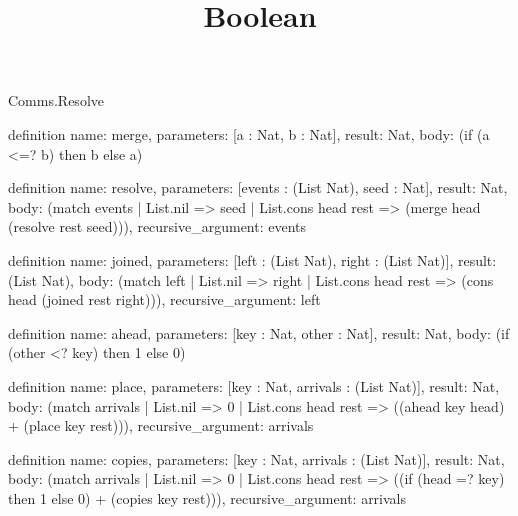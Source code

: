 \begin{lexlean}{Comms.Resolve}
\title{Boolean}
\begin{semanticmodule}
definition{
  name: merge,
  parameters: [a : Nat, b : Nat],
  result: Nat,
  body: (if (a <=? b) then b else a)
}

definition{
  name: resolve,
  parameters: [events : (List Nat), seed : Nat],
  result: Nat,
  body: (match events | List.nil => seed | List.cons head rest => (merge head (resolve rest seed))),
  recursive_argument: events
}

definition{
  name: joined,
  parameters: [left : (List Nat), right : (List Nat)],
  result: (List Nat),
  body: (match left | List.nil => right | List.cons head rest => (cons head (joined rest right))),
  recursive_argument: left
}

definition{
  name: ahead,
  parameters: [key : Nat, other : Nat],
  result: Nat,
  body: (if (other <? key) then 1 else 0)
}

definition{
  name: place,
  parameters: [key : Nat, arrivals : (List Nat)],
  result: Nat,
  body: (match arrivals
    | List.nil => 0
    | List.cons head rest => ((ahead key head) + (place key rest))),
  recursive_argument: arrivals
}

definition{
  name: copies,
  parameters: [key : Nat, arrivals : (List Nat)],
  result: Nat,
  body: (match arrivals
    | List.nil => 0
    | List.cons head rest => ((if (head =? key) then 1 else 0) + (copies key rest))),
  recursive_argument: arrivals
}
\end{semanticmodule}
\end{lexlean}
